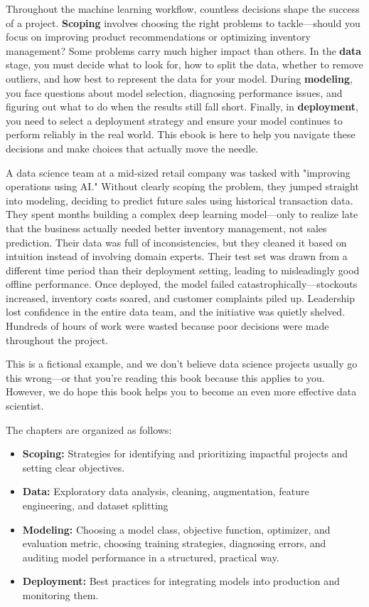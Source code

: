 \documentclass[12pt,openany]{book}
\begin{document}
Throughout the machine learning workflow, countless decisions shape the success of a project. \textbf{Scoping} involves choosing the right problems to tackle—should you focus on improving product recommendations or optimizing inventory management? Some problems carry much higher impact than others. In the \textbf{data} stage, you must decide what to look for, how to split the data, whether to remove outliers, and how best to represent the data for your model. During \textbf{modeling}, you face questions about model selection, diagnosing performance issues, and figuring out what to do when the results still fall short. Finally, in \textbf{deployment}, you need to select a deployment strategy and ensure your model continues to perform reliably in the real world. This ebook is here to help you navigate these decisions and make choices that actually move the needle. 
\newline

\begin{examplebox}
A data science team at a mid-sized retail company was tasked with "improving operations using AI." Without clearly scoping the problem, they jumped straight into modeling, deciding to predict future sales using historical transaction data. They spent months building a complex deep learning model—only to realize late that the business actually needed better inventory management, not sales prediction. Their data was full of inconsistencies, but they cleaned it based on intuition instead of involving domain experts. Their test set was drawn from a different time period than their deployment setting, leading to misleadingly good offline performance. Once deployed, the model failed catastrophically—stockouts increased, inventory costs soared, and customer complaints piled up. Leadership lost confidence in the entire data team, and the initiative was quietly shelved. Hundreds of hours of work were wasted because poor decisions were made throughout the project.
\end{examplebox}


This is a fictional example, and we don’t believe data science projects usually go this wrong—or that you’re reading this book because this applies to you. However, we do hope this book helps you to become an even more effective data scientist.
\newline


The chapters are organized as follows:
\begin{itemize}
    \item \textbf{Scoping:} Strategies for identifying and prioritizing impactful projects and setting clear objectives.
    \item \textbf{Data:} Exploratory data analysis, cleaning, augmentation, feature engineering, and dataset splitting
    \item \textbf{Modeling:} Choosing a model class, objective function, optimizer, and evaluation metric, choosing training strategies, diagnosing errors, and auditing model performance in a structured, practical way.
    \item \textbf{Deployment:} Best practices for integrating models into production and monitoring them.
\end{itemize}
\end{document}

